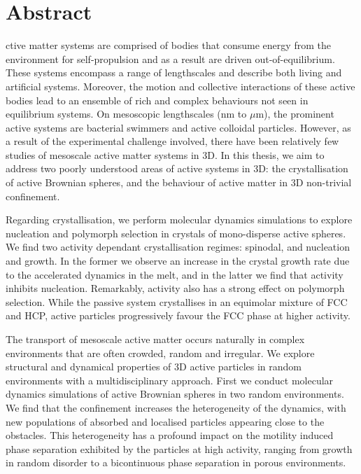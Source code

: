 %
%
%

\chapter*{Abstract}
\begin{SingleSpace}

ctive matter systems are comprised of bodies that consume energy from the environment for self-propulsion and as a result are driven out-of-equilibrium. These systems encompass a range of lengthscales and describe both living and artificial systems. Moreover, the motion and collective interactions of these active bodies lead to an ensemble of rich and complex behaviours not seen in equilibrium systems. On mesoscopic lengthscales (nm to $\mu$m), the prominent active systems are bacterial swimmers and active colloidal particles.
 However, as a result of the experimental challenge involved, there have been relatively few studies of mesoscale active matter systems in 3D. In this thesis, we aim to address two poorly understood areas of active systems in 3D: the crystallisation of active Brownian spheres, and the behaviour of active matter in 3D non-trivial confinement. 

Regarding crystallisation, we perform molecular dynamics simulations to explore nucleation and polymorph selection in crystals of mono-disperse active spheres. We find two activity dependant crystallisation regimes: spinodal, and nucleation and growth. In the former we observe an increase in the crystal growth rate due to the accelerated dynamics in the melt, and in the latter we find that activity inhibits nucleation. Remarkably, activity also has a strong effect on polymorph selection. While the passive system crystallises in an equimolar mixture of FCC and HCP, active particles progressively favour the FCC phase at higher activity.

The transport of mesoscale active matter occurs naturally in complex environments that are often crowded, random and irregular. We explore structural and dynamical properties of 3D active particles in random environments with a multidisciplinary approach. First we conduct molecular dynamics simulations of active Brownian spheres in two random environments. We find that the confinement increases the heterogeneity of the dynamics, with new populations of absorbed and localised particles appearing close to the obstacles. This heterogeneity has a profound impact on the motility induced phase separation  exhibited by the particles at high activity, ranging from growth in random disorder to a bicontinuous phase separation in porous environments.


\end{SingleSpace}
